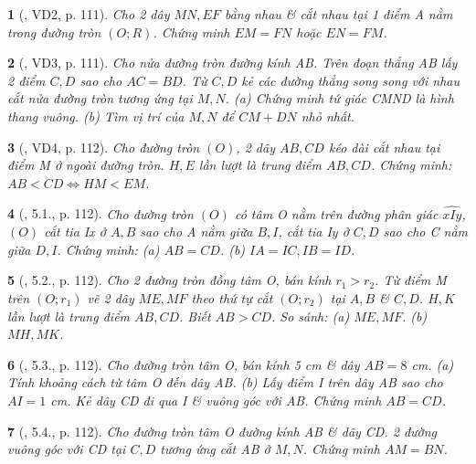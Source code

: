 \documentclass{article}
\newtheorem{baitoan}{}
\begin{document}
\begin{baitoan}[\cite{Binh_boi_duong_Toan_9_tap_1}, VD2, p. 111]
	Cho 2 dây $MN,EF$ bằng nhau \& cắt nhau tại 1 điểm A nằm trong đường tròn $(O;R)$. Chứng minh $EM = FN$ hoặc $EN = FM$.
\end{baitoan}

\begin{baitoan}[\cite{Binh_boi_duong_Toan_9_tap_1}, VD3, p. 111]
	Cho nửa đường tròn đường kính AB. Trên đoạn thẳng AB lấy 2 điểm $C,D$ sao cho $AC = BD$. Từ $C,D$ kẻ các đường thẳng song song với nhau cắt nửa đường tròn tương ứng tại $M,N$. (a) Chứng minh tứ giác CMND là hình thang vuông. (b) Tìm vị trí của $M,N$ để $CM + DN$ nhỏ nhất.
\end{baitoan}

\begin{baitoan}[\cite{Binh_boi_duong_Toan_9_tap_1}, VD4, p. 112]
	Cho đường tròn $(O)$, 2 dây $AB,CD$ kéo dài cắt nhau tại điểm M ở ngoài đường tròn. $H,E$ lần lượt là trung điểm $AB,CD$. Chứng minh: $AB < CD\Leftrightarrow HM < EM$.
\end{baitoan}

\begin{baitoan}[\cite{Binh_boi_duong_Toan_9_tap_1}, 5.1., p. 112]
	Cho đường tròn $(O)$ có tâm O nằm trên đường phân giác $\widehat{xIy}$, $(O)$ cắt tia Ix ở $A,B$ sao cho A nằm giữa $B,I$, cắt tia Iy ở $C,D$ sao cho C nằm giữa $D,I$. Chứng minh: (a) $AB = CD$. (b) $IA = IC,IB = ID$.
\end{baitoan}

\begin{baitoan}[\cite{Binh_boi_duong_Toan_9_tap_1}, 5.2., p. 112]
	Cho 2 đường tròn đồng tâm O, bán kính $r_1 > r_2$. Từ điểm M trên $(O;r_1)$ vẽ 2 dây $ME,MF$ theo thứ tự cắt $(O;r_2)$ tại $A,B$ \& $C,D$. $H,K$ lần lượt là trung điểm $AB,CD$. Biết $AB > CD$. So sánh: (a) $ME,MF$. (b) $MH,MK$.
\end{baitoan}

\begin{baitoan}[\cite{Binh_boi_duong_Toan_9_tap_1}, 5.3., p. 112]
	Cho đường tròn tâm O, bán kính {\rm5 cm} \& dây $AB = 8$ {\rm cm}. (a) Tính khoảng cách từ tâm O đến dây AB. (b) Lấy điểm I trên dây AB sao cho $AI = 1$ {\rm cm}. Kẻ dây CD đi qua I \& vuông góc với AB. Chứng minh $AB = CD$.
\end{baitoan}

\begin{baitoan}[\cite{Binh_boi_duong_Toan_9_tap_1}, 5.4., p. 112]
	Cho đường tròn tâm O đường kính AB \& dây CD. 2 đường vuông góc với CD tại $C,D$ tương ứng cắt AB ở $M,N$. Chứng minh $AM = BN$.
\end{baitoan}
\end{document}
